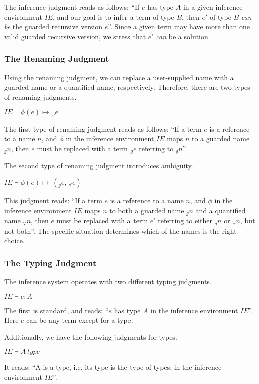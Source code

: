 The inference judgment reads as follows: ``If $e$ has type $A$ in a given
inference environment $IE$, and our goal is to infer a term of type $B$, then
$e'$ of type $B$ \emph{can be} the guarded recursive version $e$''. Since a
given term may have more than one valid guarded recursive version, we stress
that $e'$ \emph{can} be a solution.
\subsubsection{The Renaming Judgment}
Using the renaming judgment, we can replace a user-supplied name with a guarded
name or a quantified name, respectively. Therefore, there are two types of
renaming judgments.
\begin{center}
  ${IE\vdash \phi(e) \mapsto \,_ge}$
\end{center}
The first type of renaming judgment reads as follows: ``If a term $e$ is a
reference to a name $n$, and $\phi$ in the inference environment $IE$ maps $n$
to a guarded name $_gn$, then $e$ must be replaced with a term $_ge$ referring to
$_gn$''.

The second type of renaming judgment introduces ambiguity.
\begin{center}
  ${IE\vdash \phi(e) \mapsto \,(_ge,\,_{\forall}e)}$
\end{center}
This judgment reads: ``If a term $e$ is a
reference to a name $n$, and $\phi$ in the inference environment $IE$ maps $n$
to both a guarded name $_gn$ and a quantified name $_{\forall}n$, then $e$ must be replaced with a term $e'$ referring to
either $_gn$ or $_{\forall}n$, but not both''. The specific situation determines
which of the names is the right choice.

\subsubsection{The Typing Judgment}
The inference system operates with two different typing judgments.
\begin{center}
  ${IE\vdash e : A}$
\end{center}
The first is standard, and reads: ``$e$ has type $A$ in the inference
environment $IE$''. Here $e$ can be any term except for a type.

Additionally, we have the following judgments for types.
\begin{center}
  ${IE\vdash A\, type}$
\end{center}
It reads: ``A is a type, i.e. its type is the type of types, in the inference
environment $IE$''.

